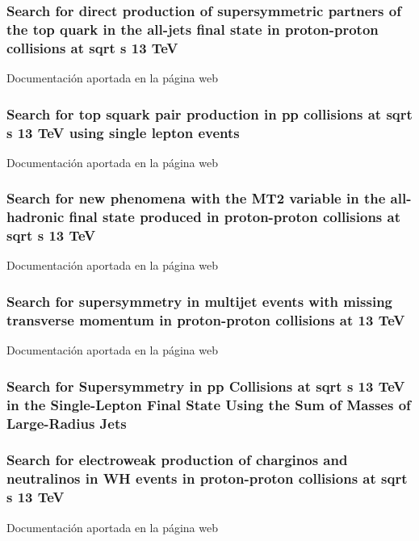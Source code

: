 \documentclass[a4paper, 11pt, twoside, openright]{report}
\begin{document}
\subsubsection{Search for direct production of supersymmetric partners of the top quark in the all-jets final state in proton-proton collisions at sqrt s 13 TeV}
Documentación aportada en la página web
%
\subsubsection{Search for top squark pair production in pp collisions at sqrt s 13 TeV using single lepton events}
Documentación aportada en la página web
%
\subsubsection{Search for new phenomena with the MT2 variable in the all-hadronic final state produced in proton-proton collisions at sqrt s 13 TeV}
Documentación aportada en la página web
%
\subsubsection{Search for supersymmetry in multijet events with missing transverse momentum in proton-proton collisions at 13 TeV}
%
Documentación aportada en la página web
\subsubsection{Search for Supersymmetry in pp Collisions at sqrt s 13 TeV in the Single-Lepton Final State Using the Sum of Masses of Large-Radius Jets}
%
\subsubsection{Search for electroweak production of charginos and neutralinos in WH events in proton-proton collisions at sqrt s 13 TeV}
Documentación aportada en la página web
%
\end{document}
